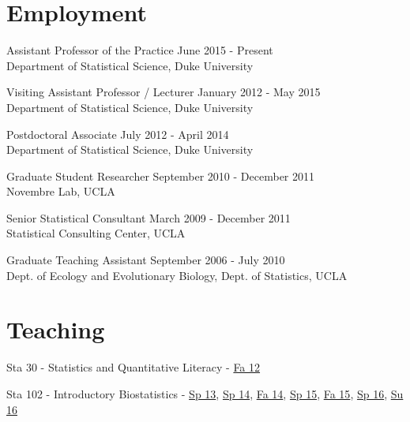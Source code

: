 \documentclass[margin,line]{res}
\begin{document}
\begin{resume}
\section{\sc Employment}

Assistant Professor of the Practice \hfill June 2015 - Present \\
{Department of Statistical Science}, Duke University \\
\vspace{-0.5cm}

Visiting Assistant Professor / Lecturer  \hfill January 2012 - May 2015 \\
{Department of Statistical Science}, Duke University \\
\vspace{-0.5cm}


Postdoctoral Associate  \hfill July 2012 - April 2014 \\
{Department of Statistical Science}, Duke University \\
\vspace{-0.5cm}

Graduate Student Researcher \hfill September 2010 - December 2011 \\
{Novembre Lab}, UCLA \\
\vspace{-0.5cm}

Senior Statistical Consultant \hfill March 2009 - December 2011 \\
{Statistical Consulting Center}, UCLA \\
\vspace{-0.50cm}

Graduate Teaching Assistant \hfill September 2006 - July 2010 \\
{Dept. of Ecology and Evolutionary Biology, Dept. of Statistics}, UCLA \\

\vspace{3mm}

\section{\sc Teaching}

Sta 30 - Statistics and Quantitative Literacy - \href{http://stat.duke.edu/courses/Spring12/sta10.1}{Fa 12}

Sta 102 - Introductory Biostatistics - \href{http://stat.duke.edu/courses/Spring13/sta102.001/}{Sp 13}, \href{https://stat.duke.edu/~cr173/Sta102_Sp14/}{Sp 14}, \href{https://stat.duke.edu/~cr173/Sta102_Fa14/}{Fa 14}, \href{https://stat.duke.edu/~cr173/Sta102_Sp15/}{Sp 15}, \href{https://stat.duke.edu/~cr173/Sta102_Fa15/}{Fa 15}, \href{http://stat.duke.edu/~cr173/Sta112_Sp16/}{Sp 16}, \href{http://stat.duke.edu/~cr173/Sta102_Su16/}{Su 16}


\end{resume}
\end{document}
